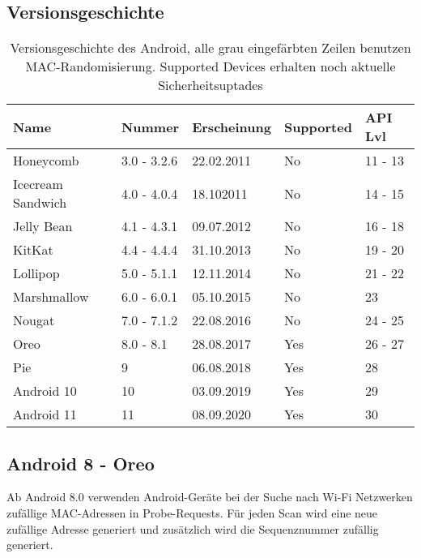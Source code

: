 \subsection{Versionsgeschichte}
    \begin{table}[H]
        \begin{tabularx}{\linewidth}{XXXXX}
            \toprule 
            \textbf{Name} & \textbf{Nummer} & \textbf{Erscheinung} & \textbf{Supported} & \textbf{API Lvl} \\
            \midrule
            Honeycomb & 3.0 - 3.2.6 & 22.02.2011 & No & 11 - 13 \\
            Icecream Sandwich & 4.0 - 4.0.4 & 18.102011 & No & 14 - 15 \\
            Jelly Bean & 4.1 - 4.3.1 & 09.07.2012 & No & 16 - 18 \\
            KitKat & 4.4 - 4.4.4 & 31.10.2013 & No & 19 - 20 \\
            \rowcolor{lightgray}
            Lollipop & 5.0 - 5.1.1 & 12.11.2014 & No & 21 - 22 \\
            \rowcolor{lightgray}
            Marshmallow & 6.0 - 6.0.1 & 05.10.2015 & No & 23 \\
            \rowcolor{lightgray}
            Nougat & 7.0 - 7.1.2 & 22.08.2016 & No & 24 - 25 \\
            \rowcolor{lightgray}
            Oreo & 8.0 - 8.1 & 28.08.2017 & Yes & 26 - 27 \\
            \rowcolor{lightgray}
            Pie & 9 & 06.08.2018 & Yes & 28 \\
            \rowcolor{lightgray}
            Android 10 & 10 & 03.09.2019 & Yes & 29 \\
            \rowcolor{lightgray}
            Android 11 & 11 & 08.09.2020 & Yes & 30 \\
            \bottomrule 
        \end{tabularx}
        \caption{Versionsgeschichte des Android, 
        alle grau eingefärbten Zeilen benutzen MAC-Randomisierung.
        Supported Devices erhalten noch aktuelle Sicherheitsuptades
        \label{table:androidversionhistory}}
    \end{table}

    \clearpage

\subsection{Android 8 - Oreo}
Ab Android 8.0 verwenden Android-Geräte bei der Suche nach Wi-Fi Netzwerken
zufällige MAC-Adressen in Probe-Requests.
Für jeden Scan wird eine neue zufällige Adresse generiert und zusätzlich
wird die Sequenznummer zufällig generiert.


